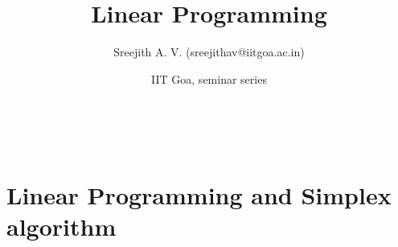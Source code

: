 \documentclass[12pt,
    driverfallback=dvipdfm,
 	openany,
    a4paper,
    toc=bibliography,
    twoside,
    numbers=noenddot]{book}              %
\title{\bf Linear Programming}    %
\author{Sreejith A. V. (sreejithav@iitgoa.ac.in)}              %
\date{IIT Goa, seminar series}                           %
\begin{document}
\renewcommand{\vec}[1]{\mathbf #1}
\newcommand{\mat}[1]{{\mathbb #1}}
\newcommand{\trans}[1]{{#1}^{\mathsf{T}}}
\newcommand{\rowvec}[1]{\trans{\vec {#1}}}
\newcommand{\dotprod}[2]{\rowvec{#1}  \vec{#2}}
\newcommand{\minimize}{\mathtt{minimize}}
\newcommand{\maximize}{\mathtt{maximize}}

\newcommand{\Imatrix}{\mat{I}}
\newcommand{\cspace}[1]{C(\mat #1)}
\newcommand{\defs}{::=}
\newcommand{\BFS}{\ensuremath{\mathrm{BFS}}\xspace}

\newcommand{\lpstd}[4]{\begin{align*}
\minimize ~\dotprod{#2}{#1} \\
\mat{#3} \vec {#1} \leq \vec #4 \\
\vec #1 \geq \vec 0
\end{align*}}
\newcommand{\lp}[4]{\begin{align*}
\minimize ~\dotprod{#2}{#1} \\
\mat{#3} \vec {#1} = \vec #4 \\
\vec #1 \geq \vec 0
\end{align*}}

\makeatletter
\newcommand{\Matrix}[1]
    {\begin{pmatrix}
      \Matrix@r #1;\@bye;\Matrix@r
     \end{pmatrix}}

\def\Matrix@r #1;{\@bye #1\Matrix@z\@bye\Matrix@s #1,\@bye, }%
\def\Matrix@s #1,{#1\Matrix@t }%
\def\Matrix@t #1,{\@bye #1\Matrix@y\@bye\@firstofone {&#1}\Matrix@t}%
\def\Matrix@y #1\Matrix@t{\\ \Matrix@r }%
\def\Matrix@z #1\Matrix@r {}
\def\@bye  #1\@bye   {}%

\makeatother

\chapter{Linear Programming and Simplex algorithm}
\end{document}
